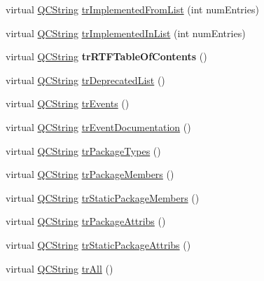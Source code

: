 \begin{DoxyCompactItemize}
\item 
virtual \mbox{\hyperlink{class_q_c_string}{Q\+C\+String}} \mbox{\hyperlink{class_translator_dutch_ad4a24b2a365f4f1dcb14bf46eee42cef}{tr\+Implemented\+From\+List}} (int num\+Entries)
\item 
virtual \mbox{\hyperlink{class_q_c_string}{Q\+C\+String}} \mbox{\hyperlink{class_translator_dutch_a9415e39c60e6c4055e832e33894dff67}{tr\+Implemented\+In\+List}} (int num\+Entries)
\item 
\mbox{\label{class_translator_dutch_aa71cf5cbac07d56330cfda9477986d44}} 
virtual \mbox{\hyperlink{class_q_c_string}{Q\+C\+String}} {\bfseries tr\+R\+T\+F\+Table\+Of\+Contents} ()
\item 
virtual \mbox{\hyperlink{class_q_c_string}{Q\+C\+String}} \mbox{\hyperlink{class_translator_dutch_a9dfeab077b7d62a76044567940295a9d}{tr\+Deprecated\+List}} ()
\item 
virtual \mbox{\hyperlink{class_q_c_string}{Q\+C\+String}} \mbox{\hyperlink{class_translator_dutch_a8b353e3faef70a92c08a0ffaa64aaf8e}{tr\+Events}} ()
\item 
virtual \mbox{\hyperlink{class_q_c_string}{Q\+C\+String}} \mbox{\hyperlink{class_translator_dutch_a2a1390c102e41e741718f917eea9b707}{tr\+Event\+Documentation}} ()
\item 
virtual \mbox{\hyperlink{class_q_c_string}{Q\+C\+String}} \mbox{\hyperlink{class_translator_dutch_ae69b64135bf5821b2835069349077c06}{tr\+Package\+Types}} ()
\item 
virtual \mbox{\hyperlink{class_q_c_string}{Q\+C\+String}} \mbox{\hyperlink{class_translator_dutch_a39ecb988a8180c47c0c045c1bf19950d}{tr\+Package\+Members}} ()
\item 
virtual \mbox{\hyperlink{class_q_c_string}{Q\+C\+String}} \mbox{\hyperlink{class_translator_dutch_a2a3387dc165af561aefef83e0f5b3d4d}{tr\+Static\+Package\+Members}} ()
\item 
virtual \mbox{\hyperlink{class_q_c_string}{Q\+C\+String}} \mbox{\hyperlink{class_translator_dutch_a4543f1dd54c990d6977aa26cfc247c8b}{tr\+Package\+Attribs}} ()
\item 
virtual \mbox{\hyperlink{class_q_c_string}{Q\+C\+String}} \mbox{\hyperlink{class_translator_dutch_acff571f657256c68acf341b3f0719959}{tr\+Static\+Package\+Attribs}} ()
\item 
virtual \mbox{\hyperlink{class_q_c_string}{Q\+C\+String}} \mbox{\hyperlink{class_translator_dutch_a2a889af1a3cfcaec26294de4ecff96c2}{tr\+All}} ()

\end{DoxyCompactItemize}
